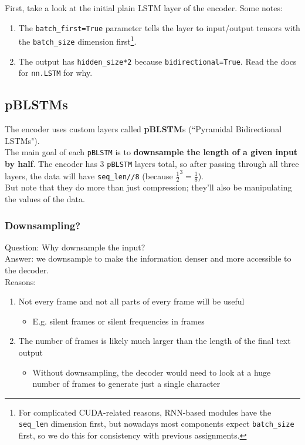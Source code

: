 \documentclass{article}
\newcommand{\ttt}[1]{\texttt{#1}}
\begin{document}
First, take a look at the initial plain LSTM layer of the encoder. Some notes:

\begin{enumerate}
    \item The \ttt{batch\_first=True} parameter tells the layer to input/output tensors with the \ttt{batch\_size} dimension first\footnote{For complicated CUDA-related reasons, RNN-based modules have the \ttt{seq\_len} dimension first, but nowadays most components expect \ttt{batch\_size} first, so we do this for consistency with previous assignments.}.
    \item The output has \ttt{hidden\_size*2} because \ttt{bidirectional=True}. Read the docs for \ttt{nn.LSTM} for why.
\end{enumerate}

\newpage

\subsection{pBLSTMs}

The encoder uses custom layers called \textbf{pBLSTM}s (``Pyramidal Bidirectional LSTMs"). \\

The main goal of each \ttt{pBLSTM} is to \textbf{downsample the length of a given input by half}. The encoder has 3 \ttt{pBLSTM} layers total, so after passing through all three layers, the data will have \ttt{seq\_len//8} (because $\frac{1}{2}^3=\frac{1}{8}$).\\

But note that they do more than just compression; they'll also be manipulating the values of the data.

\subsubsection{Downsampling?}

Question: Why downsample the input? \\

Answer: we downsample to make the information denser and more accessible to the decoder. \\

Reasons:

\begin{enumerate}
    \item Not every frame and not all parts of every frame will be useful
    \begin{itemize}
        \item E.g. silent frames or silent frequencies in frames
    \end{itemize}
    \item The number of frames is likely much larger than the length of the final text output
    \begin{itemize}
        \item Without downsampling, the decoder would need to look at a huge number of frames to generate just a single character
    \end{itemize}
\end{enumerate}
\end{document}
